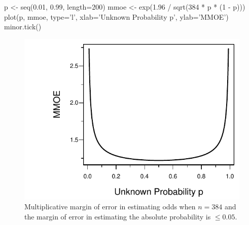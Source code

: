 \begin{Schunk}
\begin{Sinput}
p <- seq(0.01, 0.99, length=200)
mmoe <- exp(1.96 / sqrt(384 * p * (1 - p)))
plot(p, mmoe, type='l', xlab='Unknown Probability p', ylab='MMOE')
minor.tick()
\end{Sinput}
\begin{figure}[htbp]

\centerline{\includegraphics{htest-moeor-1} }

\caption[Multiplicative margin of error in estimating odds when $n=384$ and the margin of error in estimating the absolute probability is $\leq 0.05$]{Multiplicative margin of error in estimating odds when $n=384$ and the margin of error in estimating the absolute probability is $\leq 0.05$.}\label{fig:htest-moeor}
\end{figure}
\end{Schunk}

